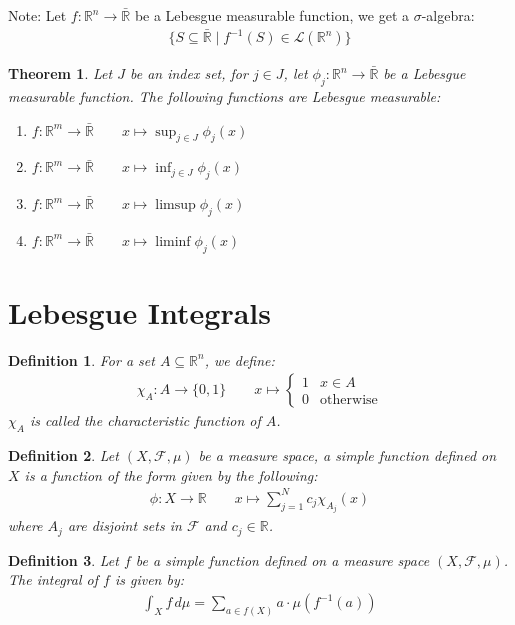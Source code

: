 \documentclass[11pt]{book}
\theoremstyle{break}
\theoremstyle{break}
\newtheorem{thm}{Theorem}[section]
\newtheorem{defn}{Definition}[corL]
\newcommand{\R}{\mathbb{R}}
\newcommand{\F}{\mathcal{F}}
\newcommand{\note}{\color{red}Note: \color{black}}
\begin{document}
\note Let $f:\R^n \to \bar{\R}$ be a Lebesgue measurable function, we get a $\sigma$-algebra:
\begin{align*}
\{S \subseteq \bar{\R}\mid f^{-1}(S) \in \mathcal{L}(\R^n) \}
\end{align*}




\begin{thm}
Let $J$ be an index set, for $j \in J$, let $\phi_j:\R^n \to \bar{\R}$ be a Lebesgue measurable function. The following functions are Lebesgue measurable:
\begin{enumerate}[topsep=3pt,itemsep=-1ex,partopsep=1ex,parsep=1ex]
\item $f:\R^m \to \bar{\R} \qquad x\mapsto \sup_{j\in J}\phi_j (x)$
\item $f:\R^m \to \bar{\R} \qquad x\mapsto \inf_{j\in J}\phi_j (x)$
\item $f:\R^m \to \bar{\R} \qquad x\mapsto \limsup \phi_j (x)$
\item $f:\R^m \to \bar{\R} \qquad x\mapsto \liminf\phi_j (x)$
\end{enumerate}
\end{thm}

\newpage
\section[Lebesgue Integrals]{\color{red} Lebesgue Integrals\color{black}}
\begin{defn}
For a set $A \subseteq \R^n$, we define:
\begin{align*}
\chi_A:A \to \{0,1\}\qquad x\mapsto \begin{cases} 1 & x \in A \\ 0 & \text{otherwise} \end{cases}
\end{align*}
$\chi_A$ is called the characteristic function of $A$. 
\end{defn}

\begin{defn}
Let $(X,\F,\mu)$ be a measure space, a simple function defined on $X$ is a function of the form given by the following:
\begin{align}
\phi: X \to \R \qquad x\mapsto \sum_{j=1}^N c_j \chi_{A_j}(x)
\end{align}
where $A_j$ are disjoint sets in $\F$ and $c_j\in \R$. 
\end{defn}

\begin{defn}
Let $f$ be a simple function defined on a measure space $(X,\mathcal{F}, \mu)$.\\ 
The integral of $f$ is given by:
\begin{align*}
\int_X f \, d\mu = \sum_{a \in f(X)}a\cdot \mu(f^{-1}(a))
\end{align*}
\end{defn}
\end{document}
